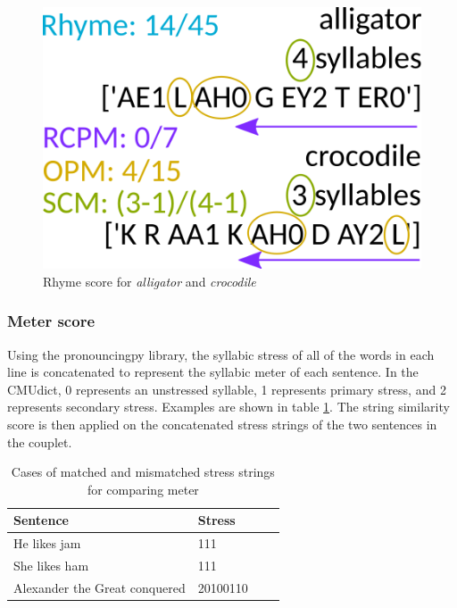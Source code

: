 \documentclass[11pt,a4paper]{article}
\begin{document}
\begin{figure}[h]
    \centering
    \includegraphics[scale=0.45]{rhyme_score.png}
    \caption{Rhyme score for \textit{alligator} and \textit{crocodile}}
    \label{fig:rhymescore}
\end{figure}

\subsubsection{Meter score}
\label{sec:stressscore}

Using the pronouncingpy library, the syllabic stress of all of the words in each line is concatenated to represent the syllabic meter \cite{meter_def} of each sentence. In the CMUdict, 0 represents an unstressed syllable, 1 represents primary stress, and 2 represents secondary stress.  Examples are shown in table \ref{table:stress}. The \citet{ratcliff} string similarity score is then applied on the concatenated stress strings of the two sentences in the couplet.

\begin{table}
\centering
\begin{tabular}{ll c c}
	\hline\hline
	Sentence & Stress \\ [0.5ex]
	\hline\hline
	He likes jam & 111 \\ [0.5ex]
	\hline
	She likes ham & 111 \\ [0.5ex]
	\hline
	Alexander the Great conquered & 20100110 \\ [0.5ex]
	\hline
\end{tabular}
\caption{Cases of matched and mismatched stress strings for comparing meter}
\label{table:stress}
\end{table}
\end{document}
